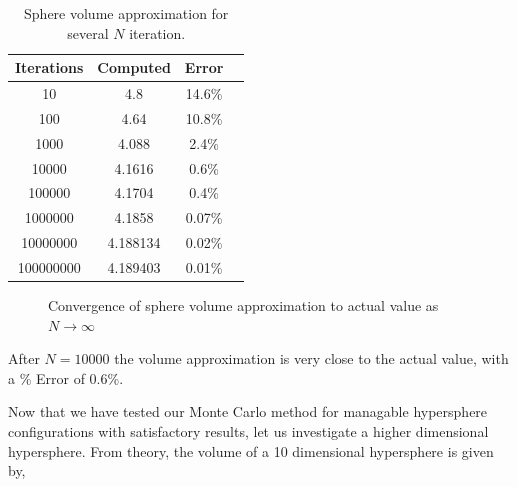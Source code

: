 \documentclass{article}
\begin{document}
\begin{table}[H]
  \begin{center}
    \begin{tabular}{|c|c|c|c|}
      \hline
      Iterations & Computed & Error \\
      \hline
      10 & 4.8 & 14.6\% \\
      \hline
      100 & 4.64 & 10.8\% \\
      \hline
      1000 & 4.088 & 2.4\% \\
      \hline
      10000 & 4.1616 & 0.6\% \\
      \hline
      100000 & 4.1704 & 0.4\% \\
      \hline
      1000000 & 4.1858 & 0.07\% \\
      \hline
      10000000 & 4.188134 & 0.02\% \\
      \hline
      100000000 & 4.189403 & 0.01\% \\
      \hline
    \end{tabular}
  \end{center}
  \caption {Sphere volume approximation for several $N$ iteration.}
  \label{tab:circle_results}
\end{table}

\begin{figure}[H]
  \begin{center}
  \end{center}
  \caption{Convergence of sphere volume approximation to actual value as $N\to \infty$}
  \label{fig:derivative}
\end{figure}

After $N = 10000$ the volume approximation is very close to the actual value, with a \% Error of 0.6\%.


Now that we have tested our Monte Carlo method for managable hypersphere configurations with satisfactory results, let us investigate
a higher dimensional hypersphere. From theory, the volume of a 10 dimensional hypersphere is given by,
\end{document}
